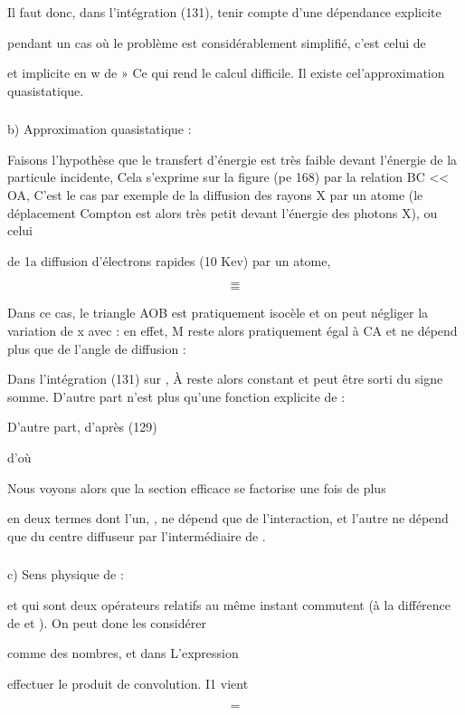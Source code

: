 Il faut donc, dans l'intégration (131), tenir compte d'une dépendance explicite

pendant un cas où le problème est considérablement simplifié, c'est celui de

et implicite en w de » Ce qui rend le calcul difficile. Il existe cel'approximation quasistatique.

\subsubsection{}%
b) Approximation quasistatique :

Faisons l'hypothèse que le transfert d'énergie est très faible
devant l'énergie de la particule incidente, Cela s'exprime sur la figure
(pe 168) par la relation BC << OA,
C'est le cas par exemple de la diffusion des rayons X par un atome (le déplacement
Compton est alors très petit devant l'énergie des photons X), ou celui

de 1a diffusion d'électrons rapides (10 Kev) par un atome,

\[
\tag{132}=
\]
\[
\tag{133}=
\]

Dans ce cas, le triangle AOB est pratiquement isocèle et on
peut négliger la variation de x avec  : en effet, M reste alors pratiquement égal
à CA et ne dépend plus que de l'angle de diffusion :

Dans l'intégration (131) sur , À reste alors constant et peut être sorti
du signe somme. D'autre part  n'est plus qu'une fonction explicite
de  :

D'autre part, d'après (129)

d'où

Nous voyons alors que la section efficace se factorise une fois de plus

en deux termes dont l'un, , ne dépend que de l'interaction, et l'autre ne
dépend que du centre diffuseur par l'intermédiaire de .

\subsubsection{}%
c) Sens physique de :

 et  qui sont deux opérateurs relatifs au même instant
commutent (à la différence de  et ). On peut done les considérer

comme des nombres, et dans L'expression

effectuer le produit de convolution. I1 vient

\[
\tag{136}=
\]


